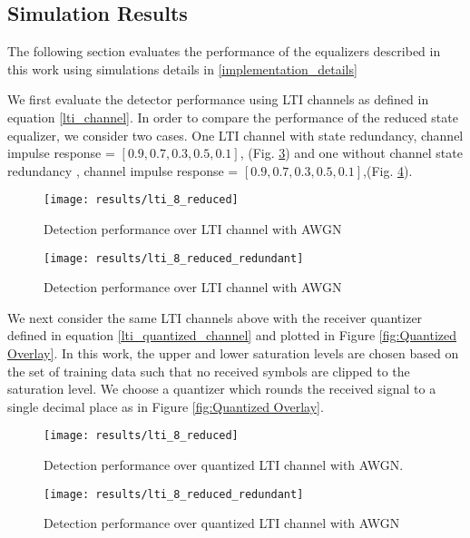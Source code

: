 \subsection{Simulation Results}
The following section evaluates the performance of the equalizers described in this work using simulations details in \ref{implementation_details}
\par
We first evaluate the detector performance using LTI channels as defined in equation \eqref{lti_channel}. In order to compare the performance of the reduced state equalizer, we consider two cases. One LTI channel with state redundancy, channel impulse response = $[0.9, 0.7, 0.3, 0.5, 0.1]$, (Fig. \ref{fig:LTI performance}) and one without channel state redundancy , channel impulse response = $[0.9, 0.7, 0.3, 0.5, 0.1]$,(Fig. \ref{fig:LTI performance redundant}). 
\begin{figure}[H]
	\texttt{[image: results/lti\_8\_reduced]}
		  \caption{Detection performance over LTI channel with AWGN}
	  \label{fig:LTI performance}
\end{figure}
\begin{figure}[H]
	\texttt{[image: results/lti\_8\_reduced\_redundant]}
		  \caption{Detection performance over LTI channel with AWGN}
	  \label{fig:LTI performance redundant}
\end{figure}

\par
We next consider the same LTI channels above with the receiver quantizer defined in equation \eqref{lti_quantized_channel} and plotted in Figure \ref{fig:Quantized Overlay}.
In this work, the upper and lower saturation levels are chosen based on the set of training data such that no received symbols are clipped to the saturation level. We choose a quantizer which rounds the received signal to a single decimal place as in Figure \ref{fig:Quantized Overlay}.

\begin{figure}[H]
	\texttt{[image: results/lti\_8\_reduced]}
		  \caption{Detection performance over quantized LTI channel with AWGN. }
	  \label{fig:LTI performance}
\end{figure}
\begin{figure}[H]
	\texttt{[image: results/lti\_8\_reduced\_redundant]}
		  \caption{Detection performance over quantized LTI channel with AWGN}
	  \label{fig:LTI performance redundant}
\end{figure}

